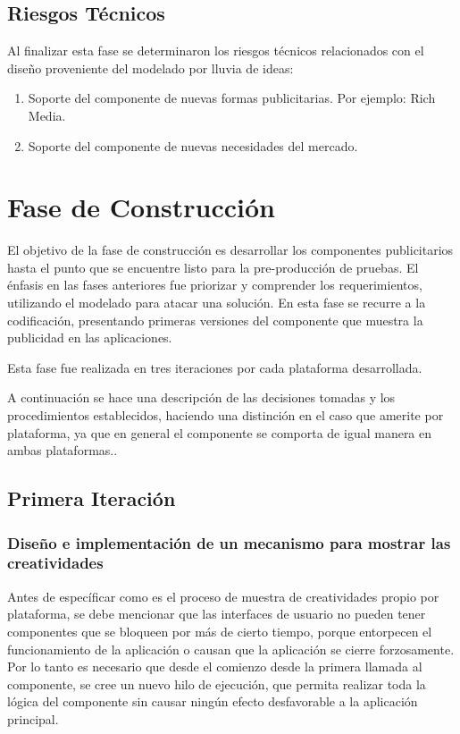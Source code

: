 \subsection{Riesgos Técnicos}

Al finalizar esta fase se determinaron los riesgos técnicos relacionados
con el diseño proveniente del modelado por lluvia de ideas:
\begin{enumerate}
\item Soporte del componente de nuevas formas publicitarias. Por ejemplo:
Rich Media.
\item Soporte del componente de nuevas necesidades del mercado.
\end{enumerate}

\section{Fase de Construcción}

El objetivo de la fase de construcción es desarrollar los componentes
publicitarios hasta el punto que se encuentre listo para la pre-producción
de pruebas. El énfasis en las fases anteriores fue priorizar y comprender
los requerimientos, utilizando el modelado para atacar una solución.
En esta fase se recurre a la codificación, presentando primeras versiones
del componente que muestra la publicidad en las aplicaciones. 

Esta fase fue realizada en tres iteraciones por cada plataforma desarrollada. 

A continuación se hace una descripción de las decisiones tomadas y
los procedimientos establecidos, haciendo una distinción en el caso
que amerite por plataforma, ya que en general el componente se comporta
de igual manera en ambas plataformas..


\subsection{Primera Iteración}


\subsubsection{Diseño e implementación de un mecanismo para mostrar las creatividades}

Antes de específicar como es el proceso de muestra de creatividades
propio por plataforma, se debe mencionar que las interfaces de usuario
no pueden tener componentes que se bloqueen por más de cierto tiempo,
porque entorpecen el funcionamiento de la aplicación o causan que
la aplicación se cierre forzosamente. Por lo tanto es necesario que
desde el comienzo desde la primera llamada al componente, se cree
un nuevo hilo de ejecución, que permita realizar toda la lógica del
componente sin causar ningún efecto desfavorable a la aplicación principal\@.


